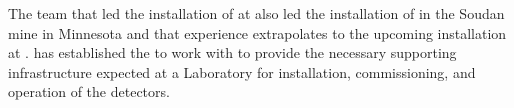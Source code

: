 The team that led the installation of  at
 also led the installation of  in the 
Soudan mine in Minnesota and that experience extrapolates to 
the upcoming installation at .  has 
established the  to work with  to 
provide the necessary supporting infrastructure expected at 
a Laboratory for installation, commissioning, and operation 
of the  detectors.
